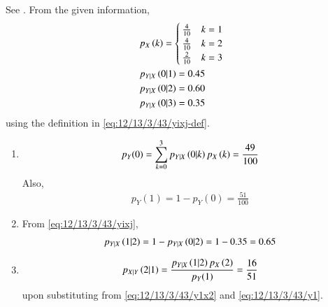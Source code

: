 See
	.
	From the given information,
\begin{align}
&p_X\left(k\right)=
\begin{cases}
		\frac{4}{10} &  k=1\\ 
		\frac{4}{10} &  k=2\\
		\frac{2}{10} &  k=3
	\end{cases}\\
&p_{Y|X}\left(0|1\right)=0.45\\
&p_{Y|X}\left(0|2\right)=0.60\\
&p_{Y|X}\left(0|3\right)=0.35
\end{align}
using the definition in 
	\eqref{eq:12/13/3/43/yixj-def}.
\begin{enumerate}
\item 
	\begin{align}
	\label{eq:12/13/3/43/y0}
	p_Y(0)=\sum_{k=0}^{3}p_{Y|X}\brak{0|k}p_X\brak{k}
=\frac{49}{100}
\end{align}
Also, 
\begin{align}
	\label{eq:12/13/3/43/y1}
	p_Y(1) = 1-p_Y(0)
=\frac{51}{100}
\end{align}
\item
	From 
	\eqref{eq:12/13/3/43/yixj},
\begin{align}
	\label{eq:12/13/3/43/y1x2}
p_{Y|X}\brak{1|2}=1-p_{Y|X}\brak{0|2}
=1-0.35
=0.65
\end{align}
\item 
\begin{align}
p_{X|Y}\left(2|1\right)=\frac{p_{Y|X}\left(1|2\right)p_X\left(2\right)}{p_Y(1)}
=\frac{16}{51}
\end{align}
upon substituting from 
	\eqref{eq:12/13/3/43/y1x2}
	and
	\eqref{eq:12/13/3/43/y1}.
\end{enumerate}
\begin{table}[!htb]
\centering
	
	\caption{}
	\label{tab:12/13/3/43}
\end{table}
